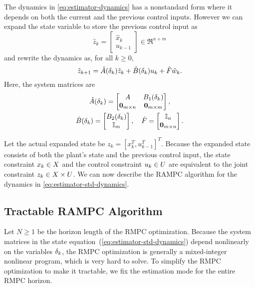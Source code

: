The dynamics in \eqref{eq:estimator-dynamics} has a nonstandard form
where it depends on both the current and the previous control inputs.
However we can expand the state variable to store the previous control
input as
\[
\hat{z}_{k}=\begin{bmatrix}\hat{x}_{k}\\
u_{k-1}
\end{bmatrix}\in\Re^{n+m}
\]
and rewrite the dynamics as, for all $k\geq0$,
\begin{equation}
\hat{z}_{k+1}=\hat{A}(\delta_k)\hat{z}_{k}+\hat{B}(\delta_k)u_{k}+\hat{F}\hat{w}_{k}\text{.}\label{eq:estimator-std-dynamics}
\end{equation}
Here, the system matrices are
\begin{equation}
\begin{gathered}
\hat{A}(\delta_k)=\begin{bmatrix}A & B_{1}(\delta_k)\\
\bm{0}_{m\times n} & \bm{0}_{m\times m}
\end{bmatrix},\\
\hat{B}(\delta_k)=\begin{bmatrix}B_{2}(\delta_k)\\
\mathbb{I}_{m}
\end{bmatrix},\quad\hat{F}=\begin{bmatrix}\mathbb{I}_{n}\\
\bm{0}_{m\times n}
\end{bmatrix}\text{.}
\end{gathered}
\label{eq:lifted-matrices}
\end{equation}

Let the actual expanded state be $z_{k}=\left[x_{k}^{T},u_{k-1}^{T}\right]^{T}$.
Because the expanded state consists of both the plant's state and
the previous control input, the state constraint $x_{k}\in X$
and the control constraint $u_{k}\in U$ are equivalent to the
joint constraint $z_{k}\in X\times U$. We can now describe
the RAMPC algorithm for the dynamics in \eqref{eq:estimator-std-dynamics}.

\subsection{Tractable RAMPC Algorithm}

Let $N\geq1$ be the horizon length of the RMPC optimization. 
Because the system
matrices in the state equation~(\ref{eq:estimator-std-dynamics})
depend nonlinearly on the variables $\delta_k$, the RMPC optimization
is generally a mixed-integer nonlinear program, which is very hard
to solve. To simplify the RMPC optimization to make it tractable, we fix the estimation mode for the entire RMPC horizon.

